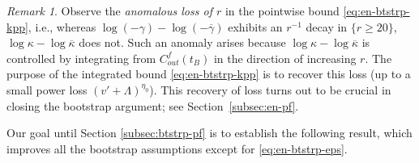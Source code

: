 \documentclass[10pt, reqno]{amsart}
\theoremstyle{definition}
\theoremstyle{remark}
\newtheorem{remark}[theorem]{Remark}
\theoremstyle{conjecture}
\numberwithin{equation}{section}
\newcommand{\set}[1]{\{#1\}}
\newcommand{\0}{\emptyset}
\newcommand{\gmm}{\gamma}
\newcommand{\kpp}{\kappa}
\newcommand{\lmb}{\lambda}
\newcommand{\Lmb}{\Lambda}
\newcommand{\dur}{\nu}
\newcommand{\dvr}{\lmb}
\newcommand{\kppbg}{\overline{\kpp}}					%
\newcommand{\gmmbg}{\overline{\gmm}}					%
\begin{document}
\begin{remark} \label{rem:kpp-anomaly}
Observe the \emph{anomalous loss of $r$} in the pointwise bound \eqref{eq:en-btstrp-kpp}, i.e., whereas $\log (-\gmm) - \log (-\gmmbg)$ exhibits an $r^{-1}$ decay in $\set{r \geq 20}$, $\log \kpp - \log \kppbg$ does not. Such an anomaly arises because $\log \kpp - \log \kppbg$ is controlled by integrating from $C_{out}^{f}(t_{B})$ in the direction of increasing $r$. The purpose of the integrated bound \eqref{eq:en-btstrp-kpp} is to recover this loss (up to a small power loss $(v' + \Lmb)^{\eta_{0}}$). This recovery of loss turns out to be crucial in closing the bootstrap argument; see Section~\ref{subsec:en-pf}.
\end{remark}

Our goal until Section \ref{subsec:btstrp-pf} is to establish the following result, which improves all the bootstrap assumptions except for \eqref{eq:en-btstrp-eps}.
\end{document}
